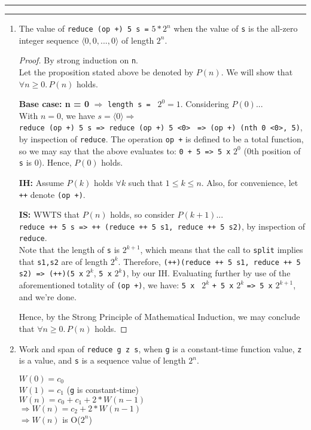 \documentclass[11pt]{article}
\newcommand{\question}[2] {\vspace{.25in} \hrule\vspace{0.5em}
\noindent{\bf #1: #2} \vspace{0.5em}
\hrule \vspace{.10in}}
\begin{document}
\question{7}{Sequence Thingies}
\begin{enumerate}
\item The value of \verb|reduce (op +) 5 s =| $5*2^n$ when the value of \verb|s| is the all-zero integer sequence $\langle0,0,...,0\rangle$ of length $2^n$.
\begin{proof}By strong induction on \verb|n|.\\
Let the proposition stated above be denoted by $P(n)$.  We will show that $\forall n \geq 0.\, P(n)$ holds.

\textbf{Base case: n = 0} $\Rightarrow$ \verb|length s = | $2^0 = 1$. Considering $P(0)$...\\ With $n = 0$, we have $s = \langle 0 \rangle \Rightarrow$\\
 \verb|reduce (op +) 5 s => reduce (op +) 5 <0>| \verb| => (op +) (nth 0 <0>, 5)|, by inspection of \verb|reduce|.  The operation \verb|op +| is defined to be a total function, so we may say that the above evaluates to: \verb|0 + 5 => 5 x| $2^0$ (0th position of \verb|s| is $0$).  Hence, $P(0)$ holds.

\textbf{IH:} Assume $P(k)$ holds $\forall k$ such that $1 \leq k \leq n$.  Also, for convenience, let \verb|++| denote \verb|(op +)|.

\textbf{IS:} WWTS that $P(n)$ holds, so consider $P(k+1)$...\\
\verb|reduce ++ 5 s => ++ (reduce ++ 5 s1, reduce ++ 5 s2)|, by inspection of \verb|reduce|.\\
Note that the length of \verb|s| is $2^{k+1}$, which means that the call to \verb|split| implies that \verb|s1,s2| are of length $2^k$.  Therefore, 
\verb|(++)(reduce ++ 5 s1, reduce ++ 5 s2) => (++)(5 x| $2^k$, \verb|5 x| $2^k$\verb|)|, by our IH.  Evaluating further by use of the aforementioned totality of \verb|(op +)|, we have: \verb|5 x | $2^k$ \verb|+ 5 x| $2^k$ \verb|=> 5 x| $2^{k+1}$, and we're done.

Hence, by the Strong Principle of Mathematical Induction, we may conclude that $\forall n \geq 0.\, P(n)$ holds.
\end{proof}
\item Work and span of \verb|reduce g z s|, when \verb|g| is a constant-time function value, \verb|z| is a value, and \verb|s| is a sequence value of length $2^n$.

$W(0) = c_0$\\
$W(1) = c_1$ (\verb|g| is constant-time)\\
$W(n) = c_0 + c_1 + 2*W(n-1)$\\
$\Rightarrow W(n) = c_2 + 2*W(n-1)$\\
$\Rightarrow W(n)$ is O($2^n$)


\end{enumerate}
\end{document}
